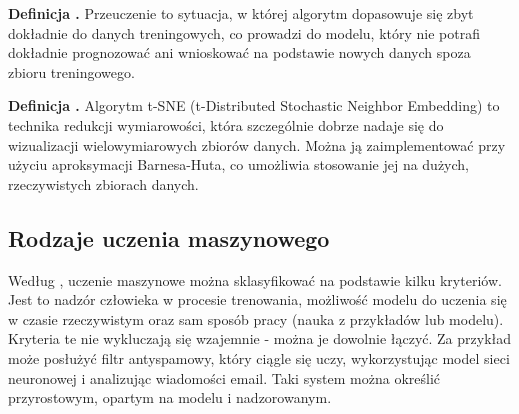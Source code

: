 \noindent
\textbf{Definicja \mlDefinitionIndex.}
\incrementMlDefinitionIndex
Przeuczenie to sytuacja, w której algorytm dopasowuje się zbyt dokładnie do danych treningowych,
co prowadzi do modelu, który nie potrafi dokładnie prognozować ani wnioskować na podstawie nowych danych spoza zbioru treningowego. 

\noindent
\textbf{Definicja \mlDefinitionIndex.}
\incrementMlDefinitionIndex
Algorytm t-SNE (t-Distributed Stochastic Neighbor Embedding) to technika redukcji wymiarowości,
która szczególnie dobrze nadaje się do wizualizacji wielowymiarowych zbiorów danych.
Można ją zaimplementować przy użyciu aproksymacji Barnesa-Huta,
co umożliwia stosowanie jej na dużych, rzeczywistych zbiorach danych.

\subsection{Rodzaje uczenia maszynowego}
Według \cite{Geron2020}, uczenie maszynowe można sklasyfikować na podstawie kilku kryteriów.
Jest to nadzór człowieka w procesie trenowania, możliwość modelu do uczenia się w czasie rzeczywistym
oraz sam sposób pracy (nauka z przykładów lub modelu). Kryteria te nie wykluczają się wzajemnie - można je dowolnie łączyć.
Za przykład może posłużyć filtr antyspamowy, który ciągle się uczy,
wykorzystując model sieci neuronowej i analizując wiadomości email.
Taki system można określić przyrostowym, opartym na modelu i nadzorowanym.

